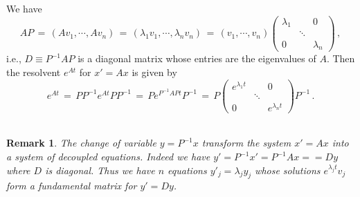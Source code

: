\documentclass[12pt]{report}
\newtheorem{remark}[theorem]{Remark}
\newcommand{\proof}{\noindent {\em Proof:~}}
\def\qed{\hbox{\hskip 6pt\vrule width6pt height7pt depth1pt
    \hskip1pt}\bigskip}
\begin{document}
\proof   We have 
\begin{equation}
A P \,=\, \left( Av_1, \cdots, Av_n \right) 
\,=\, \left( \lambda_1v_1, \cdots, \lambda_n v_n \right) 
\,=\, (v_1, \cdots, v_n) \left( \begin{array}{ccc} \lambda_1 & &0\\  
& \ddots  & \\ 0 & & \lambda_n\end{array}\right) \,,
\end{equation}     
i.e., $D \equiv P^{-1} A P$ is a diagonal matrix whose entries 
are the eigenvalues of $A$.  Then the resolvent $e^{At}$ for $x'=Ax$ is given by 
\begin{equation}
e^{At} \,=\, P P^{-1} e^{At} P P^{-1} \,=\, P e^{P^{-1} A P t} P^{-1}
\,=\, P \left( \begin{array}{ccc} e^{\lambda_1 t} & &0\\ & \ddots & \\
0 & & e^{\lambda_n t}
\end{array}\right) P^{-1} \,.
\end{equation}
\hfill \qed




\begin{remark}{\rm The change of variable $y=P^{-1}x$ transform the system $x'=Ax$ 
into a system of decoupled equations. Indeed we have $y' = P^{-1}x'= P^{-1}Ax= = Dy$ 
where $D$ is diagonal. Thus we have $n$ equations $y'_j = \lambda_j y_j$ whose solutions  
$e^{\lambda_j t} v_j$ form a fundamental matrix for $y'=Dy$.  
}\end{remark} 
\end{document}
